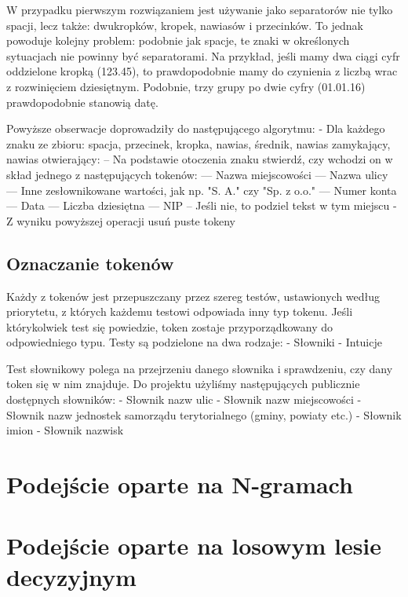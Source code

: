 \documentclass[a4paper,oneside,12pt]{article}
\begin{document}
W przypadku pierwszym rozwiązaniem jest używanie jako separatorów nie tylko spacji, lecz także: dwukropków, kropek, nawiasów i przecinków. To jednak powoduje kolejny problem: podobnie jak spacje, te znaki w określonych sytuacjach nie powinny być separatorami. Na przykład, jeśli mamy dwa ciągi cyfr oddzielone kropką (123.45), to prawdopodobnie mamy do czynienia z liczbą wrac z rozwinięciem dziesiętnym. Podobnie, trzy grupy po dwie cyfry (01.01.16) prawdopodobnie stanowią datę.

Powyższe obserwacje doprowadziły do następującego algorytmu:
- Dla każdego znaku ze zbioru: {spacja, przecinek, kropka, nawias, średnik, nawias zamykający, nawias otwierający}:
-- Na podstawie otoczenia znaku stwierdź, czy wchodzi on w skład jednego z następujących tokenów:
--- Nazwa miejscowości
--- Nazwa ulicy
--- Inne zesłownikowane wartości, jak np. "S. A." czy "Sp. z o.o."
--- Numer konta
--- Data
--- Liczba dziesiętna
--- NIP
-- Jeśli nie, to podziel tekst w tym miejscu
- Z wyniku powyższej operacji usuń puste tokeny

\subsection{Oznaczanie tokenów}

Każdy z tokenów jest przepuszczany przez szereg testów, ustawionych według priorytetu, z których każdemu testowi odpowiada inny typ tokenu. Jeśli którykolwiek test się powiedzie, token zostaje przyporządkowany do odpowiedniego typu. Testy są podzielone na dwa rodzaje:
- Słowniki
- Intuicje
 
Test słownikowy polega na przejrzeniu danego słownika i sprawdzeniu, czy dany token się w nim znajduje. Do projektu użyliśmy następujących publicznie dostępnych słowników:
- Słownik nazw ulic
- Słownik nazw miejscowości
- Słownik nazw jednostek samorządu terytorialnego (gminy, powiaty etc.)
- Słownik imion
- Słownik nazwisk

\section{Podejście oparte na N-gramach}

\section{Podejście oparte na losowym lesie decyzyjnym}
\end{document}
